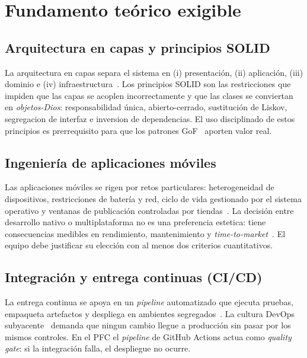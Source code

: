 \documentclass[11pt,a4paper]{article}
\begin{document}
    \normalsize

\section{Fundamento teórico exigible}

\subsection{Arquitectura en capas y principios SOLID}

    La arquitectura en capas separa el sistema en (i) presentación, (ii) aplicación, (iii) dominio e (iv) infraestructura~\cite{Martin2017CleanArch,Evans2003DDD}. Los principios SOLID son las restricciones que impiden que las capas se acoplen incorrectamente y que las clases se conviertan en \emph{objetos-Dios}: responsabilidad única, abierto-cerrado, sustitución de Liskov, segregacion de interfaz e inversion de dependencias. El uso disciplinado de estos principios es prerrequisito para que los patrones GoF~\cite{Gamma1994GoF} aporten valor real.

\subsection{Ingeniería de aplicaciones móviles}

    Las aplicaciones móviles se rigen por retos particulares: heterogeneidad de dispositivos, restricciones de batería y red, ciclo de vida gestionado por el sistema operativo y ventanas de publicación controladas por tiendas~\cite{Wasserman2010MobileSE}. La decisión entre desarrollo nativo o multiplataforma no es una preferencia estetica: tiene consecuencias medibles en rendimiento, mantenimiento y \textit{time-to-market}~\cite{ElKassas2017CrossPlatform,BiornHansen2019CrossPlatform,Ahmad2018CrossPlatformSurvey}. El equipo debe justificar su elección con al menos dos criterios cuantitativos.

\subsection{Integración y entrega continuas (CI/CD)}

    La entrega continua se apoya en un \textit{pipeline} automatizado que ejecuta pruebas, empaqueta artefactos y despliega en ambientes segregados~\cite{Humble2010CD}. La cultura DevOps subyacente~\cite{Kim2021DevOpsHandbook} demanda que ningun cambio llegue a producción sin pasar por los mismos controles. En el PFC el \emph{pipeline} de GitHub Actions actua como \emph{quality gate}: si la integración falla, el despliegue no ocurre.
\end{document}
